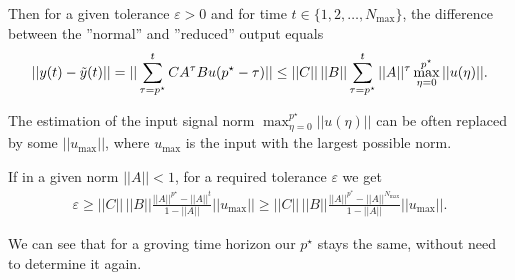 	Then for a given tolerance $\varepsilon>0$ and for time $t \in \{1,2, \dots , N_{\max}\}$, the difference between the ''normal'' and ''reduced'' output equals
	\begin{align}
	||y(t) - \tilde{y}(t)|| = ||\sum_{\tau = p^\star}^{t} C A^{\tau} B u(p^\star - \tau)|| \leq ||C|| \, ||B|| \sum_{\tau = p^\star}^t ||A||^\tau \max_{\eta = 0}^{p^\star}||u(\eta)||. 
	\end{align}
	
	The estimation of the input signal norm $\max_{\eta = 0}^{p^\star}||u(\eta)||$ can be often replaced by some $||u_{\max}||$, where $u_{\max}$ is the input with the largest possible norm.  
	
	If in a given norm $||A||<1$,  for a required tolerance $\varepsilon$ we get 	
	\begin{align}
	\varepsilon \geq ||C||\, ||B|| \frac{||A||^{p^\star} - ||A||^{t}}{1 - ||A||} ||u_{\max}|| \geq ||C|| \, ||B|| \frac{||A||^{p^*} - ||A||^{N_{\max}}}{1 - ||A||}||u_{\max}||. 
	\end{align}
	
	We can see that for a groving time horizon our $p^\star$ stays the same, without need to determine it again. 
	

	
	
	
	
	
	